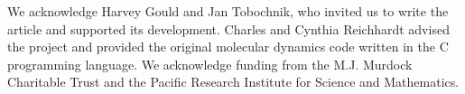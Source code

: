 \documentclass[twocolumn,preprintnumbers,amsmath,amssymb,aps,prx]{revtex4}
\begin{document}


\begin{acknowledgments}

  We acknowledge Harvey Gould and Jan Tobochnik,
  who invited us to write the article and
  supported its development.
  Charles and Cynthia Reichhardt advised 
  the project and provided the original molecular dynamics code
  written in the C programming language.
  We acknowledge funding from the M.J. Murdock Charitable Trust
  and the Pacific Research Institute for Science and Mathematics. %

\end{acknowledgments}
\end{document}
